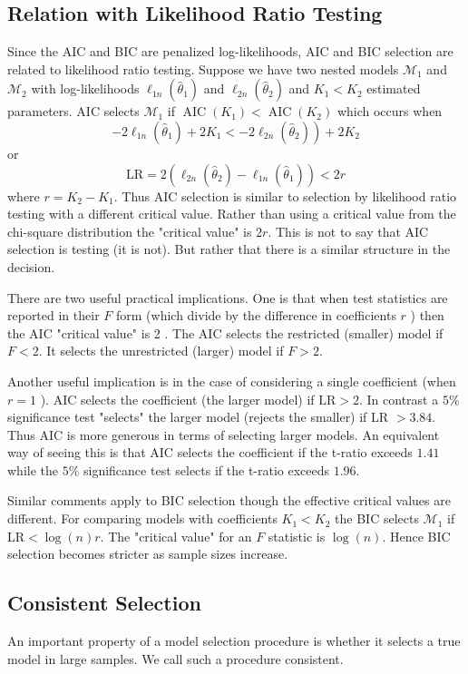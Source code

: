 \documentclass[10pt]{article}
\begin{document}
\subsection{Relation with Likelihood Ratio Testing}
Since the AIC and BIC are penalized log-likelihoods, AIC and BIC selection are related to likelihood ratio testing. Suppose we have two nested models $\mathscr{M}_{1}$ and $\mathscr{M}_{2}$ with log-likelihoods $\ell_{1 n}\left(\widehat{\theta}_{1}\right)$ and $\ell_{2 n}\left(\widehat{\theta}_{2}\right)$ and $K_{1}<K_{2}$ estimated parameters. AIC selects $\mathscr{M}_{1}$ if $\operatorname{AIC}\left(K_{1}\right)<\operatorname{AIC}\left(K_{2}\right)$ which occurs when
$$
\left.-2 \ell_{1 n}\left(\widehat{\theta}_{1}\right)+2 K_{1}<-2 \ell_{2 n}\left(\widehat{\theta}_{2}\right)\right)+2 K_{2}
$$
or
$$
\mathrm{LR}=2\left(\ell_{2 n}\left(\widehat{\theta}_{2}\right)-\ell_{1 n}\left(\widehat{\theta}_{1}\right)\right)<2 r
$$
where $r=K_{2}-K_{1}$. Thus AIC selection is similar to selection by likelihood ratio testing with a different critical value. Rather than using a critical value from the chi-square distribution the "critical value" is $2 r$. This is not to say that AIC selection is testing (it is not). But rather that there is a similar structure in the decision.

There are two useful practical implications. One is that when test statistics are reported in their $F$ form (which divide by the difference in coefficients $r$ ) then the AIC "critical value" is 2 . The AIC selects the restricted (smaller) model if $F<2$. It selects the unrestricted (larger) model if $F>2$.

Another useful implication is in the case of considering a single coefficient (when $r=1$ ). AIC selects the coefficient (the larger model) if $\mathrm{LR}>2$. In contrast a $5 \%$ significance test "selects" the larger model (rejects the smaller) if LR $>3.84$. Thus AIC is more generous in terms of selecting larger models. An equivalent way of seeing this is that AIC selects the coefficient if the t-ratio exceeds $1.41$ while the $5 \%$ significance test selects if the t-ratio exceeds $1.96$.

Similar comments apply to BIC selection though the effective critical values are different. For comparing models with coefficients $K_{1}<K_{2}$ the BIC selects $\mathscr{M}_{1}$ if $\mathrm{LR}<\log (n) r$. The "critical value" for an $F$ statistic is $\log (n)$. Hence BIC selection becomes stricter as sample sizes increase.

\subsection{Consistent Selection}
An important property of a model selection procedure is whether it selects a true model in large samples. We call such a procedure consistent.
\end{document}
